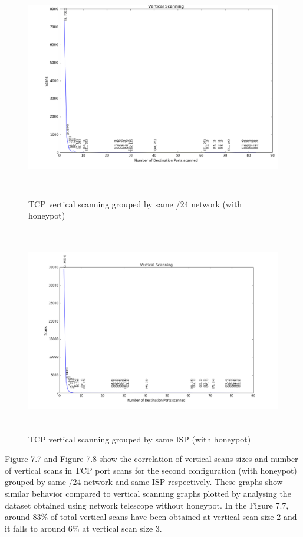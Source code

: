 \begin{figure}[p]
\centering
\includegraphics[width=15cm,height=9cm]{images/vertical_scans_march_classc}
\caption{ TCP vertical scanning grouped by same /24 network (with honeypot)}
\centering
\includegraphics[width=16.5cm,height=9cm]{images/vertical_scans_march_isp}
\caption{ TCP vertical scanning grouped by same ISP (with honeypot)}
\end{figure}
\newpage
\noindent
Figure 7.7 and Figure 7.8 show the correlation of vertical scans sizes and number of vertical scans in TCP port scans for the second configuration (with honeypot) grouped by same /24 network and same ISP respectively. 
These graphs show similar behavior compared to vertical scanning graphs plotted by analysing the dataset obtained using network telescope without honeypot. 
In the Figure 7.7, around 83\% of total vertical scans have been obtained at vertical scan size 2 and it falls to around 6\% at vertical scan size 3.
